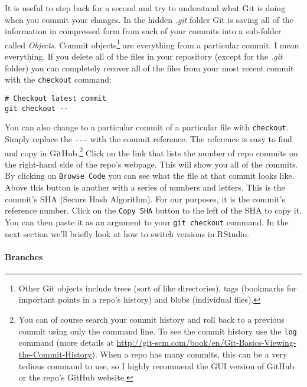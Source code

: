 It is useful to step back for a second and try to understand what Git is doing when you commit your changes. In the hidden {\emph{.git}} folder Git is saving all of the information in compressed form from each of your commits into a sub-folder called {\emph{Objects}}. Commit objects\footnote{Other Git objects include trees (sort of like directories), tags (bookmarks for important points in a repo's history) and blobs (individual files).} are everything from a particular commit. I mean everything. If you delete all of the files in your repository (except for the {\emph{.git}} folder) you can completely recover all of the files from your most recent commit with the \texttt{checkout} command:

\begin{knitrout}
\color{fgcolor}\begin{kframe}
\begin{verbatim}
# Checkout latest commit
git checkout --
\end{verbatim}
\end{kframe}
\end{knitrout}


\noindent You can also change to a particular commit of a particular file with \texttt{checkout}. Simply replace the \verb|---| with the commit reference. The reference is easy to find and copy in GitHub.\footnote{You can of course search your commit history and roll back to a previous commit using only the command line. To see the commit history use the \texttt{log} command (more details at \url{http://git-scm.com/book/en/Git-Basics-Viewing-the-Commit-History}). When a repo has many commits, this can be a very tedious command to use, so I highly recommend the GUI version of GitHub or the repo's GitHub website.} Click on the link that lists the number of repo commits on the right-hand side of the repo's webpage. This will show you all of the commits. By clicking on {\tt{Browse Code}} you can see what the file at that commit looks like. Above this button is another with a series of numbers and letters. This is the commit's SHA (Secure Hash Algorithm). For our purposes, it is the commit's reference number. Click on the {\tt{Copy SHA}} button to the left of the SHA to copy it. You can then paste it as an argument to your {\tt{git checkout}} command. In the next section we'll briefly look at how to switch versions in RStudio.

\paragraph{Branches}

